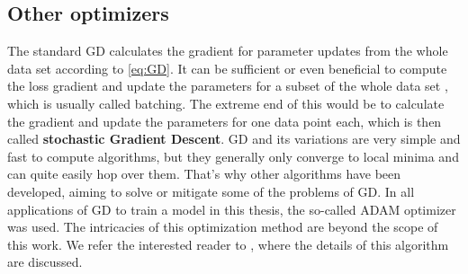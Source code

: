 \subsection{Other optimizers}
The standard GD calculates the gradient for parameter updates from the whole data set according to \cref{eq:GD}. It can be sufficient or even beneficial to compute the loss gradient and update the parameters for a subset of the whole data set \cite{SGDLocalMinima}, which is usually called batching. The extreme end of this would be to calculate the gradient and update the parameters for one data point each, which is then called \textbf{stochastic Gradient Descent}.
GD and its variations are very simple and fast to compute algorithms, but they generally only converge to local minima and can quite easily hop over them. That's why other algorithms have been developed, aiming to solve or mitigate some of the problems of GD. In all applications of GD to train a model in this thesis, the so-called ADAM optimizer was used. The intricacies of this optimization method are beyond the scope of this work. We refer the interested reader to \cite{adamPaper}, where the details of this algorithm are discussed. %



